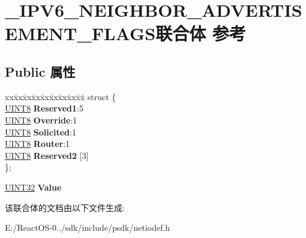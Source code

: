 \hypertarget{union___i_p_v6___n_e_i_g_h_b_o_r___a_d_v_e_r_t_i_s_e_m_e_n_t___f_l_a_g_s}{}\section{\+\_\+\+I\+P\+V6\+\_\+\+N\+E\+I\+G\+H\+B\+O\+R\+\_\+\+A\+D\+V\+E\+R\+T\+I\+S\+E\+M\+E\+N\+T\+\_\+\+F\+L\+A\+G\+S联合体 参考}
\label{union___i_p_v6___n_e_i_g_h_b_o_r___a_d_v_e_r_t_i_s_e_m_e_n_t___f_l_a_g_s}
\subsection*{Public 属性}
\begin{DoxyCompactItemize}
\item 
\mbox{\label{union___i_p_v6___n_e_i_g_h_b_o_r___a_d_v_e_r_t_i_s_e_m_e_n_t___f_l_a_g_s_a38b2d7e195267d44f992704ecfbc4a3b}} 
\begin{tabbing}
xx\=xx\=xx\=xx\=xx\=xx\=xx\=xx\=xx\=\kill
struct \{\\
\>\hyperlink{_processor_bind_8h_ab27e9918b538ce9d8ca692479b375b6a}{UINT8} {\bfseries Reserved1}:5\\
\>\hyperlink{_processor_bind_8h_ab27e9918b538ce9d8ca692479b375b6a}{UINT8} {\bfseries Override}:1\\
\>\hyperlink{_processor_bind_8h_ab27e9918b538ce9d8ca692479b375b6a}{UINT8} {\bfseries Solicited}:1\\
\>\hyperlink{_processor_bind_8h_ab27e9918b538ce9d8ca692479b375b6a}{UINT8} {\bfseries Router}:1\\
\>\hyperlink{_processor_bind_8h_ab27e9918b538ce9d8ca692479b375b6a}{UINT8} {\bfseries Reserved2} \mbox{[}3\mbox{]}\\
\}; \\

\end{tabbing}\item 
\mbox{\label{union___i_p_v6___n_e_i_g_h_b_o_r___a_d_v_e_r_t_i_s_e_m_e_n_t___f_l_a_g_s_accc8f6badac52cf9e31f89fd365d6627}} 
\hyperlink{_processor_bind_8h_ae1e6edbbc26d6fbc71a90190d0266018}{U\+I\+N\+T32} {\bfseries Value}
\end{DoxyCompactItemize}


该联合体的文档由以下文件生成\+:\begin{DoxyCompactItemize}
\item 
E\+:/\+React\+O\+S-\/0../sdk/include/psdk/netiodef.\+h\end{DoxyCompactItemize}
